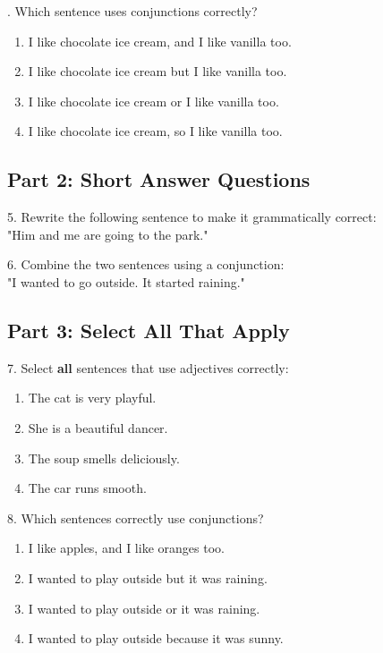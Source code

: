 \documentclass[12pt]{article}
\begin{document}
\vspace{1cm}
. Which sentence uses conjunctions correctly?\\
\begin{enumerate}[label=\Alph*.]
    \item I like chocolate ice cream, and I like vanilla too.  
    \item I like chocolate ice cream but I like vanilla too.  
    \item I like chocolate ice cream or I like vanilla too.  
    \item I like chocolate ice cream, so I like vanilla too.  
\end{enumerate}

\vspace{1cm}


\subsection*{Part 2: Short Answer Questions}

5. Rewrite the following sentence to make it grammatically correct: \\
"Him and me are going to the park."\\
\vspace{3cm}

6. Combine the two sentences using a conjunction: \\
"I wanted to go outside. It started raining."\\
\vspace{3cm}

\subsection*{Part 3: Select All That Apply}

7. Select \textbf{all} sentences that use adjectives correctly:\\
\begin{enumerate}[label=\Alph*.]
    \item The cat is very playful.  
    \item She is a beautiful dancer.  
    \item The soup smells deliciously.  
    \item The car runs smooth.  
\end{enumerate}

\vspace{1cm}

8. Which sentences correctly use conjunctions?\\
\begin{enumerate}[label=\Alph*.]
    \item I like apples, and I like oranges too.  
    \item I wanted to play outside but it was raining.  
    \item I wanted to play outside or it was raining.  
    \item I wanted to play outside because it was sunny.  
\end{enumerate}
\end{document}
